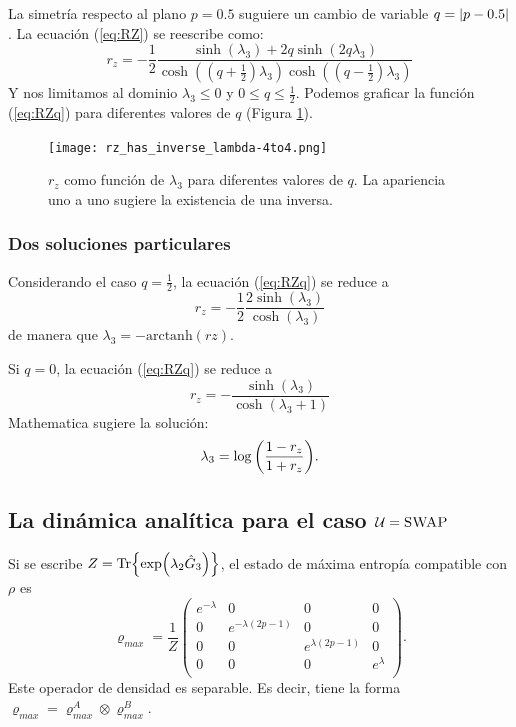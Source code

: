 La simetría respecto al plano $p=0.5$ suguiere un cambio de variable $q=\abs{p-0.5}$. La ecuación (\ref{eq:RZ}) se reescribe como:
\begin{equation}\label{eq:RZq}
r_{z}=-\frac{1}{2}\frac{\sinh(\lambda_{3})+2q\sinh(2q\lambda_{3})}{\cosh((q+\frac{1}{2})\lambda_{3})\cosh((q-\frac{1}{2})\lambda_{3})}
\end{equation}
Y nos limitamos al dominio $\lambda_{3}\leq0$ y $0\leq q\leq\frac{1}{2}$. Podemos graficar la función (\ref{eq:RZq}) para diferentes valores de $q$ (Figura \ref{fig:rzinv}).
\begin{figure}[h!]
\centering
\texttt{[image: rz\_has\_inverse\_lambda-4to4.png]}
\caption{$r_{z}$ como función de $\lambda_{3}$ para diferentes valores de $q$. La apariencia uno a uno sugiere la existencia de una inversa.}
\label{fig:rzinv}
\end{figure}
\subsubsection{Dos soluciones particulares}

Considerando el caso $q=\frac{1}{2}$, la ecuación (\ref{eq:RZq}) se reduce a 
\begin{equation}
r_z=-\frac{1}{2}\frac{2\sinh(\lambda_{3})}{\cosh(\lambda_{3})}
\end{equation}
de manera que $\lambda_{3}=-\text{arctanh}(rz)$.

Si $q=0$, la ecuación (\ref{eq:RZq}) se reduce a
\begin{equation}
r_z=-\frac{\sinh(\lambda_{3})}{\cosh(\lambda_{3}+1)}
\end{equation}
Mathematica sugiere la solución:
\begin{equation}\label{eq:lambda0.5}
\lambda_{3}=\log\qty(\frac{1-r_{z}}{1+r_{z}}).
\end{equation}

\subsection{La dinámica analítica para el caso $\mathcal{U}=\textsc{SWAP}$}

Si se escribe $Z=\Tr{\exp(\lambda_{2}\hat{G}_{3})}$, el estado de máxima entropía compatible con $\rho$ es
\begin{equation}
\varrho_{max}=\frac{1}{Z}\begin{pmatrix}
 e^{-\lambda } & 0 & 0 & 0 \\
 0 & e^{-\lambda  (2 p-1)} & 0 & 0 \\
 0 & 0 & e^{\lambda  (2 p-1)} & 0 \\
 0 & 0 & 0 & e^{\lambda } \\
\end{pmatrix}.
\end{equation}
Este operador de densidad es separable. Es decir, tiene la forma $\varrho_{max}=\varrho_{max}^{A}\otimes\varrho_{max}^{B}$.


